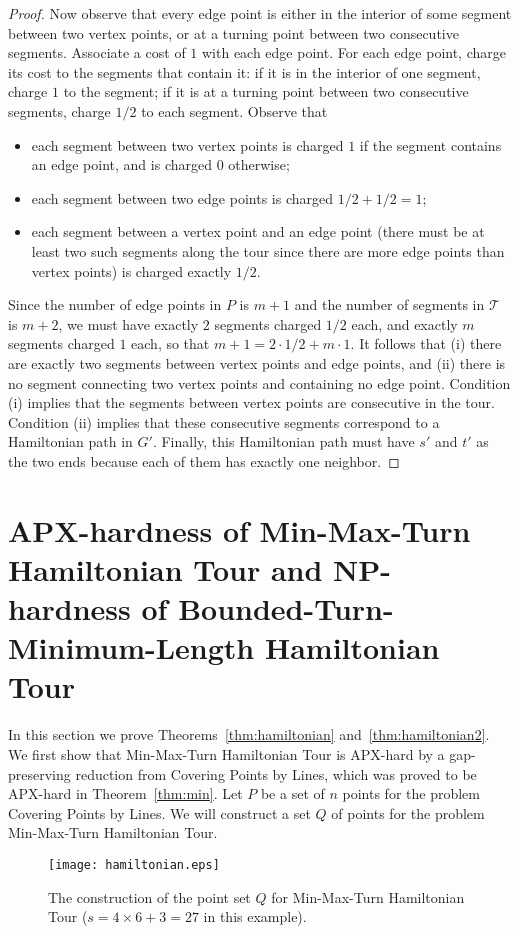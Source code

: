 \documentclass[letterpaper,11pt]{article}
\def\T{{\mathcal T}}
\begin{document}
\begin{proof}
Now observe that every edge point is
either in the interior of some segment between two vertex points,
or at a turning point between two consecutive segments.
Associate a cost of $1$ with each edge point.
For each edge point, charge its cost to the segments that contain it:
if it is in the interior of one segment, charge $1$ to the segment;
if it is at a turning point between two consecutive segments,
charge $1/2$ to each segment.
Observe that
\begin{itemize} \itemsep -1pt
\item
each segment between two vertex points is charged $1$ if the segment
contains an edge point, and is charged $0$ otherwise;
\item
each segment between two edge points is charged $1/2 + 1/2 = 1$;
\item
each segment between a vertex point and an edge point
(there must be at least two such segments along the tour
since there are more edge points than vertex points)
is charged exactly $1/2$.
\end{itemize}
Since the number of edge points in $P$ is $m+1$
and the number of segments in $\T$ is $m+2$,
we must have exactly $2$ segments charged $1/2$ each,
and exactly $m$ segments charged $1$ each,
so that $m+1 = 2\cdot 1/2 + m\cdot 1$.
It follows that (i)
there are exactly two segments between vertex points and edge points,
and (ii)
there is no segment connecting two vertex points and containing no edge point.
Condition (i) implies that the segments between vertex points
are consecutive in the tour.
Condition (ii) implies that these consecutive segments correspond to
a Hamiltonian path in $G'$.
Finally, this Hamiltonian path must have $s'$ and $t'$ as the two ends
because each of them has exactly one neighbor.
\end{proof}


\section{APX-hardness of {\sc Min-Max-Turn Hamiltonian Tour}
	and NP-hardness of {\sc Bounded-Turn-Minimum-Length Hamiltonian Tour}}

In this section we prove
Theorems~\ref{thm:hamiltonian} and~\ref{thm:hamiltonian2}.
We first show that {\sc Min-Max-Turn Hamiltonian Tour} is APX-hard
by a gap-preserving reduction from {\sc Covering Points by Lines},
which was proved to be APX-hard in Theorem~\ref{thm:min}.
Let $P$ be a set of $n$ points for the problem {\sc Covering Points by Lines}.
We will construct a set $Q$ of points for the problem
{\sc Min-Max-Turn Hamiltonian Tour}.
\begin{figure}[htb]
\centering\texttt{[image: hamiltonian.eps]}
\caption{The construction of the point set $Q$ for {\sc Min-Max-Turn Hamiltonian
Tour} ($s=4 \times 6 +3=27$ in this example).}
\label{fig:hamiltonian}
\end{figure}
\end{document}
